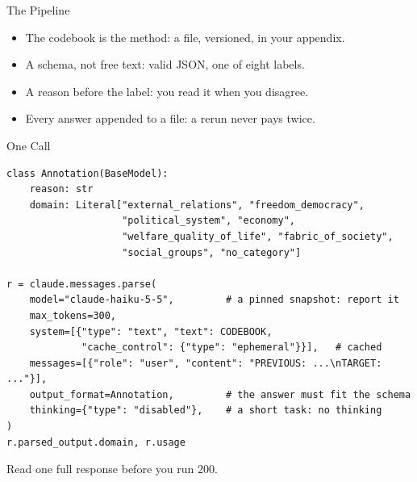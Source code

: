 \documentclass[svgnames,x11names,dvipsnames]{beamer}
\begin{document}
\begin{frame}{The Pipeline}
\centering
{}

\vspace{0.5cm}
\raggedright
\begin{itemize}
    \setlength{\itemsep}{4pt}
    \item The codebook is the method: a file, versioned, in your appendix.
    \item A schema, not free text: valid JSON, one of eight labels.
    \item A reason before the label: you read it when you disagree.
    \item Every answer appended to a file: a rerun never pays twice.
\end{itemize}
\end{frame}

\begin{frame}[fragile]{One Call}
\scriptsize
\begin{verbatim}
class Annotation(BaseModel):
    reason: str
    domain: Literal["external_relations", "freedom_democracy",
                    "political_system", "economy",
                    "welfare_quality_of_life", "fabric_of_society",
                    "social_groups", "no_category"]

r = claude.messages.parse(
    model="claude-haiku-5-5",         # a pinned snapshot: report it
    max_tokens=300,
    system=[{"type": "text", "text": CODEBOOK,
             "cache_control": {"type": "ephemeral"}}],   # cached
    messages=[{"role": "user", "content": "PREVIOUS: ...\nTARGET: ..."}],
    output_format=Annotation,         # the answer must fit the schema
    thinking={"type": "disabled"},    # a short task: no thinking
)
r.parsed_output.domain, r.usage
\end{verbatim}

\vspace{0.3cm}
\small
Read one full response before you run 200.
\end{frame}
\end{document}
